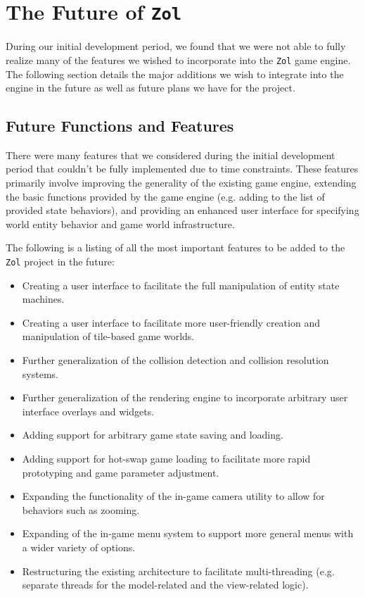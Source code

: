 \documentclass{article}
\newcommand{\projectname}[0] {\texttt{Zol} }
\begin{document}
	\section[Future Plans]{The Future of \projectname}
	During our initial development period, we found that we were not able to
	fully realize many of the features we wished to incorporate into the
	\projectname game engine.  The following section details the major additions
	we wish to integrate into the engine in the future as well as future plans 
	we have for the project.

		\subsection[Features]{Future Functions and Features}
		There were many features that we considered during the initial development 
		period that couldn't be fully implemented due to time constraints.  These
		features primarily involve improving the generality of the existing game
		engine, extending the basic functions provided by the game engine (e.g.
		adding to the list of provided state behaviors), and providing an enhanced
		user interface for specifying world entity behavior and game world 
		infrastructure.

		The following is a listing of all the most important features to be added
		to the \projectname project in the future:

		\begin{itemize}
			\item Creating a user interface to facilitate the full manipulation 
			of entity state machines.

			\item Creating a user interface to facilitate more user-friendly
			creation and manipulation of tile-based game worlds.

			\item Further generalization of the collision detection and collision
			resolution systems.

			\item Further generalization of the rendering engine to incorporate
			arbitrary user interface overlays and widgets.

			\item Adding support for arbitrary game state saving and loading.

			\item Adding support for hot-swap game loading to facilitate more
			rapid prototyping and game parameter adjustment.

			\item Expanding the functionality of the in-game camera utility to
			allow for behaviors such as zooming.

			\item Expanding of the in-game menu system to support more general
			menus with a wider variety of options.

			\item Restructuring the existing architecture to facilitate
			multi-threading (e.g. separate threads for the model-related and
			the view-related logic).
		\end{itemize}
\end{document}

